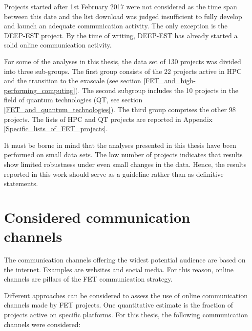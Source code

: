 Projects started after 1st February 2017 were not considered as the time span between this date and the list download was judged insufficient to fully develop and launch an adequate communication activity. The only exception is the DEEP-EST project. By the time of writing, DEEP-EST has already started a solid online communication activity.    

For some of the analyses in this thesis, the data set of 130 projects was divided into three sub-groups.  The first group consists of the 22 projects active in HPC and the transition to the exascale (see section \ref{FET_and_high-performing_computing}). The second subgroup includes the 10 projects in the field of quantum technologies (QT, see section \ref{FET_and_quantum_technologies}). The third group comprises the other 98 projects. The lists of HPC and QT projects are reported in Appendix \ref{Specific_lists_of_FET_projects}.

It must be borne in mind that the analyses presented in this thesis have been performed on small data sets. The low number of projects indicates that results show limited robustness under even small changes in the data. Hence, the results reported in this work should serve as a guideline rather than as definitive statements.  

\section{Considered communication channels} \label{Considered_channels}
The communication channels offering the widest potential audience are based on the internet. Examples are websites and social media. For this reason, online channels are pillars of the FET communication strategy. 

Different approaches can be considered to assess the use of online communication channels made by FET projects. One quantitative estimate is the fraction of projects active on specific platforms. For this thesis, the following communication channels were considered:   

